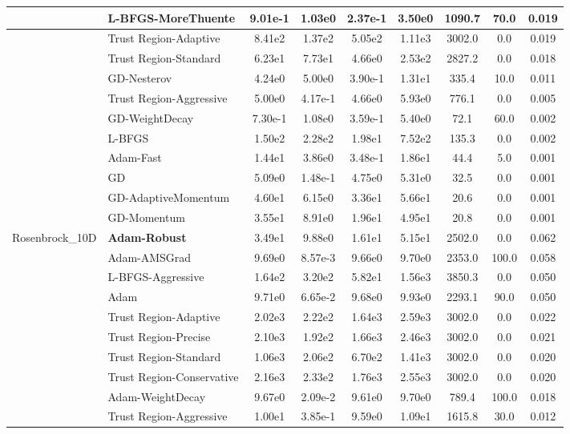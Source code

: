 \documentclass[10pt]{article}
\begin{document}
\begin{longtable}{|l|l|c|c|c|c|c|c|c|}
\hline
 & L-BFGS-MoreThuente & 9.01e-1 & 1.03e0 & 2.37e-1 & 3.50e0 & 1090.7 & 70.0 & 0.019 \\
\hline
 & Trust Region-Adaptive & 8.41e2 & 1.37e2 & 5.05e2 & 1.11e3 & 3002.0 & 0.0 & 0.019 \\
\hline
 & Trust Region-Standard & 6.23e1 & 7.73e1 & 4.66e0 & 2.53e2 & 2827.2 & 0.0 & 0.018 \\
\hline
 & GD-Nesterov & 4.24e0 & 5.00e0 & 3.90e-1 & 1.31e1 & 335.4 & 10.0 & 0.011 \\
\hline
 & Trust Region-Aggressive & 5.00e0 & 4.17e-1 & 4.66e0 & 5.93e0 & 776.1 & 0.0 & 0.005 \\
\hline
 & GD-WeightDecay & 7.30e-1 & 1.08e0 & 3.59e-1 & 5.40e0 & 72.1 & 60.0 & 0.002 \\
\hline
 & L-BFGS & 1.50e2 & 2.28e2 & 1.98e1 & 7.52e2 & 135.3 & 0.0 & 0.002 \\
\hline
 & Adam-Fast & 1.44e1 & 3.86e0 & 3.48e-1 & 1.86e1 & 44.4 & 5.0 & 0.001 \\
\hline
 & GD & 5.09e0 & 1.48e-1 & 4.75e0 & 5.31e0 & 32.5 & 0.0 & 0.001 \\
\hline
 & GD-AdaptiveMomentum & 4.60e1 & 6.15e0 & 3.36e1 & 5.66e1 & 20.6 & 0.0 & 0.001 \\
\hline
 & GD-Momentum & 3.55e1 & 8.91e0 & 1.96e1 & 4.95e1 & 20.8 & 0.0 & 0.001 \\
Rosenbrock\_10D & \textbf{Adam-Robust} & 3.49e1 & 9.88e0 & 1.61e1 & 5.15e1 & 2502.0 & 0.0 & 0.062 \\
\hline
 & Adam-AMSGrad & 9.69e0 & 8.57e-3 & 9.66e0 & 9.70e0 & 2353.0 & 100.0 & 0.058 \\
\hline
 & L-BFGS-Aggressive & 1.64e2 & 3.20e2 & 5.82e1 & 1.56e3 & 3850.3 & 0.0 & 0.050 \\
\hline
 & Adam & 9.71e0 & 6.65e-2 & 9.68e0 & 9.93e0 & 2293.1 & 90.0 & 0.050 \\
\hline
 & Trust Region-Adaptive & 2.02e3 & 2.22e2 & 1.64e3 & 2.59e3 & 3002.0 & 0.0 & 0.022 \\
\hline
 & Trust Region-Precise & 2.10e3 & 1.92e2 & 1.66e3 & 2.46e3 & 3002.0 & 0.0 & 0.021 \\
\hline
 & Trust Region-Standard & 1.06e3 & 2.06e2 & 6.70e2 & 1.41e3 & 3002.0 & 0.0 & 0.020 \\
\hline
 & Trust Region-Conservative & 2.16e3 & 2.33e2 & 1.76e3 & 2.55e3 & 3002.0 & 0.0 & 0.020 \\
\hline
 & Adam-WeightDecay & 9.67e0 & 2.09e-2 & 9.61e0 & 9.70e0 & 789.4 & 100.0 & 0.018 \\
\hline
 & Trust Region-Aggressive & 1.00e1 & 3.85e-1 & 9.59e0 & 1.09e1 & 1615.8 & 30.0 & 0.012 \\

\end{longtable}
\end{document}
